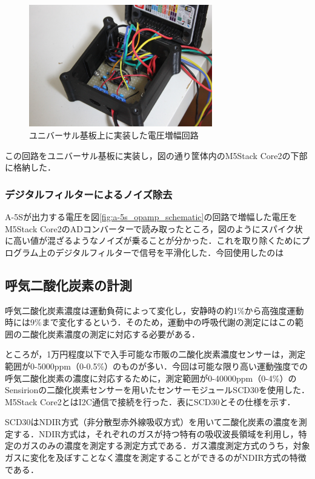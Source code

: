 \begin{figure}[H]
  \begin{center}
    \includegraphics[width=8cm]{fig/opamp_universal}
    \caption{ユニバーサル基板上に実装した電圧増幅回路}
    \label{fig:opamp_universal}
  \end{center}
\end{figure}

この回路をユニバーサル基板に実装し，図の通り筐体内のM5Stack Core2の下部に格納した．

\subsubsection{デジタルフィルターによるノイズ除去}

A-5Sが出力する電圧を図\ref{fig:a-5s_opamp_schematic}の回路で増幅した電圧をM5Stack Core2のADコンバーターで読み取ったところ，図のようにスパイク状に高い値が混ざるようなノイズが乗ることが分かった．これを取り除くためにプログラム上のデジタルフィルターで信号を平滑化した．今回使用したのは

\subsection{呼気二酸化炭素の計測}

呼気二酸化炭素濃度は運動負荷によって変化し，安静時の約1\%から高強度運動時には9\%まで変化するという\cite{co2_percent}．そのため，運動中の呼吸代謝の測定にはこの範囲の二酸化炭素濃度の測定に対応する必要がある．

ところが，1万円程度以下で入手可能な市販の二酸化炭素濃度センサーは，測定範囲が0-5000ppm（0-0.5\%）のものが多い．今回は可能な限り高い運動強度での呼気二酸化炭素の濃度に対応するために，測定範囲が0-40000ppm（0-4\%）のSensirionの二酸化炭素センサーを用いたセンサーモジュールSCD30を使用した．M5Stack Core2とはI2C通信で接続を行った．表にSCD30とその仕様を示す．

SCD30はNDIR方式（非分散型赤外線吸収方式）を用いて二酸化炭素の濃度を測定する．NDIR方式は，それぞれのガスが持つ特有の吸収波長領域を利用し，特定のガスのみの濃度を測定する測定方式である．ガス濃度測定方式のうち，対象ガスに変化を及ぼすことなく濃度を測定することができるのがNDIR方式の特徴である\cite{whats_ndir}．

